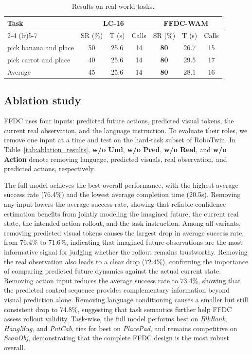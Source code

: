 \documentclass{article}
\begin{document}
\begin{table}[h]
\centering
\caption{Results on real-world tasks.}
\label{tab:real_exp}
\setlength{\tabcolsep}{2pt}
\renewcommand{\arraystretch}{0.8}
\begin{tabular}{lcccccc}
\toprule
\multirow{2}{*}{Task} 
& \multicolumn{3}{c}{LC-16} 
& \multicolumn{3}{c}{FFDC-WAM} \\
\cmidrule(lr){2-4} \cmidrule(lr){5-7}
& SR (\%) & T (s) & Calls & SR (\%) & T (s) & Calls \\
\midrule
pick banana and place & 50 & 25.6 & 14 & \textbf{80} & 26.7 & 15 \\
pick carrot and place & 40 & 25.6 & 14 & \textbf{80} & 29.5 & 17 \\
\midrule
Average & 45 & 25.6 & 14 & \textbf{80} & 28.1 & 16 \\
\bottomrule
\end{tabular}
\end{table}


\subsection{Ablation study}
\label{sec:ablation}
FFDC uses four inputs: predicted future actions, predicted visual tokens, the current real observation, and the language instruction. To evaluate their roles, we remove one input at a time and test on the hard-task subset of RoboTwin. In Table~\ref{tab:ablation_results}, \textbf{w/o Und}, \textbf{w/o Pred}, \textbf{w/o Real}, and \textbf{w/o Action} denote removing language, predicted visuals, real observation, and predicted actions, respectively.

The full model achieves the best overall performance, with the highest average success rate (76.4\%) and the lowest average completion time (20.5s). Removing any input lowers the average success rate, showing that reliable confidence estimation benefits from jointly modeling the imagined future, the current real state, the intended action rollout, and the task instruction. Among all variants, removing predicted visual tokens causes the largest drop in average success rate, from 76.4\% to 71.6\%, indicating that imagined future observations are the most informative signal for judging whether the rollout remains trustworthy. Removing the real observation also leads to a clear drop (72.4\%), confirming the importance of comparing predicted future dynamics against the actual current state. Removing action input reduces the average success rate to 73.4\%, showing that the predicted control sequence provides complementary information beyond visual prediction alone. Removing language conditioning causes a smaller but still consistent drop to 74.8\%, suggesting that task semantics further help FFDC assess rollout validity. Task-wise, the full model performs best on \textit{BlkRank}, \textit{HangMug}, and \textit{PutCab}, ties for best on \textit{PlacePad}, and remains competitive on \textit{ScanObj}, demonstrating that the complete FFDC design is the most robust overall.
\end{document}
